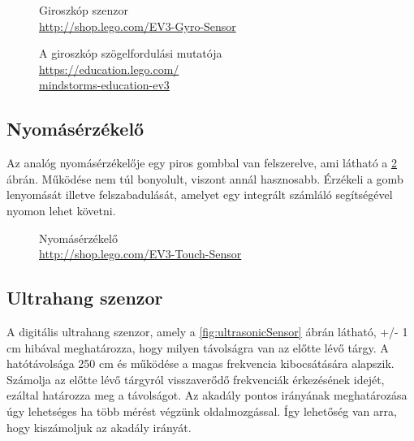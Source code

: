 \begin{figure}[!htb]
	\centering
	\captionsetup{justification=centering,margin=1.5cm}
	\caption[Giroszkóp szenzor]
	{Giroszkóp szenzor\\
	\href{http://shop.lego.com/en-CA/EV3-Gyro-Sensor-45505}{http://shop.lego.com/EV3-Gyro-Sensor}}
	\label{fig:gyroSensor}
	\endminipage
	\captionsetup{justification=centering,margin=0.5cm}
	\caption[A giroszkóp szögelfordulási mutatója]
	{A giroszkóp szögelfordulási mutatója\\
	\href{https://education.lego.com/en-au/preschool-and-school/secondary/mindstorms-education-ev3/instant-success/instant-success-3}{https://education.lego.com/\\mindstorms-education-ev3}}
	\label{fig:gyroFok}
	\endminipage
\end{figure}

\subsection{Nyomásérzékelő}
Az analóg nyomásérzékelője egy piros gombbal van felszerelve, ami látható a \ref{fig:touchSensor} ábrán. Működése nem túl bonyolult, viszont annál hasznosabb. Érzékeli a gomb lenyomását illetve felszabadulását, amelyet egy integrált számláló segítségével nyomon lehet követni. 

\begin{figure}[!htb]
	\centering
	\caption[Nyomásérzékelő]
	{Nyomásérzékelő\\
	\href{http://shop.lego.com/en-CA/EV3-Touch-Sensor-45507}{http://shop.lego.com/EV3-Touch-Sensor}}
	\label{fig:touchSensor}
\end{figure}

\subsection{Ultrahang szenzor}
A digitális ultrahang szenzor, amely a \ref{fig:ultrasonicSensor} ábrán látható, +/- 1 cm hibával meghatározza, hogy milyen távolságra van az előtte lévő tárgy. A hatótávolsága 250 cm és működése a magas frekvencia kibocsátására  alapszik. Számolja az előtte lévő tárgyról visszaverődő frekvenciák érkezésének idejét, ezáltal határozza meg a távolságot. Az akadály pontos irányának meghatározása úgy lehetséges ha több mérést végzünk oldalmozgással. Így lehetőség van arra, hogy kiszámoljuk az akadály irányát.

